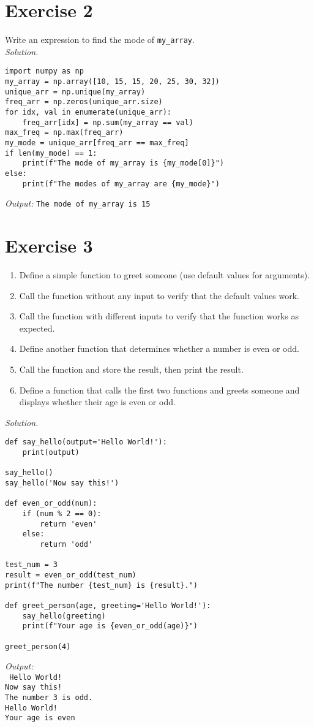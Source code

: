\documentclass[11pt]{article}
\begin{document}
\section{Exercise 2}
Write an expression to find the mode of \texttt{my\_array}. \\
\textit{Solution.}
\begin{lstlisting}
import numpy as np
my_array = np.array([10, 15, 15, 20, 25, 30, 32])
unique_arr = np.unique(my_array)
freq_arr = np.zeros(unique_arr.size)
for idx, val in enumerate(unique_arr):
    freq_arr[idx] = np.sum(my_array == val)
max_freq = np.max(freq_arr)
my_mode = unique_arr[freq_arr == max_freq]
if len(my_mode) == 1:
    print(f"The mode of my_array is {my_mode[0]}")
else:
    print(f"The modes of my_array are {my_mode}")
\end{lstlisting}
\textit{Output:} \texttt{The mode of my\_array is 15}

\section{Exercise 3}
\begin{enumerate}
    \item Define a simple function to greet someone (use default values for arguments).
    \item Call the function without any input to verify that the default values work.
    \item Call the function with different inputs to verify that the function works as expected.
    \item Define another function that determines whether a number is even or odd.
    \item Call the function and store the result, then print the result.
    \item Define a function that calls the first two functions and greets someone and displays whether their age is even or odd.
\end{enumerate}
\textit{Solution.}
\begin{lstlisting}
def say_hello(output='Hello World!'):
    print(output)

say_hello()
say_hello('Now say this!')

def even_or_odd(num):
    if (num % 2 == 0):
        return 'even'
    else:
        return 'odd'

test_num = 3
result = even_or_odd(test_num)
print(f"The number {test_num} is {result}.")

def greet_person(age, greeting='Hello World!'):
    say_hello(greeting)
    print(f"Your age is {even_or_odd(age)}")

greet_person(4)
\end{lstlisting}
\textit{Output:} \\
\texttt{
Hello World! \\
Now say this! \\
The number 3 is odd. \\
Hello World! \\
Your age is even \\
}
\end{document}
